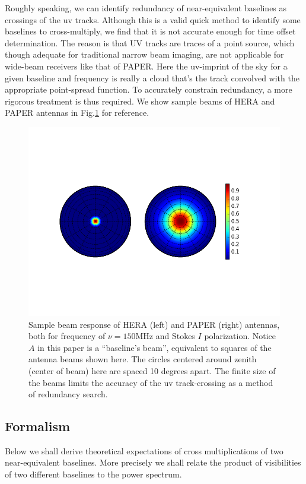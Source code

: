 \documentclass[preprint2,numberedappendix,tighten,twocolappendix]{aastex6}  %
\renewcommand\[{\begin{equation}}
\renewcommand\]{\end{equation}}
\begin{document}
Roughly speaking, we can identify
redundancy of near-equivalent baselines as crossings
of the uv tracks. Although this is a valid quick method to identify some baselines to cross-multiply, we find
that it is not accurate enough for time offset determination. The reason is that UV tracks are traces of a point source, which though adequate for traditional narrow beam imaging, are not applicable for wide-beam receivers like that of PAPER.
Here the uv-imprint of the sky for a given baseline and frequency is really a cloud that's the track convolved with the appropriate point-spread function. To accurately
constrain redundancy, a more rigorous treatment is thus required. 
We show sample beams of HERA and PAPER antennas in Fig.\ref{fig:Beam} for reference. 

\begin{figure}[H]
\includegraphics[width=1.2\linewidth]{Beams}

\caption{Sample beam response of HERA (left) and PAPER (right) antennas, both
for frequency of $\nu=150\text{MHz}$ and Stokes $I$ polarization. Notice $A$ in this paper is a ``baseline's beam'', equivalent to squares of the antenna beams shown here. The circles centered around zenith (center of beam) here are
spaced 10 degrees apart. The finite size of the beams limits the accuracy of the uv track-crossing as a method of redundancy search. \label{fig:Beam}}
\end{figure}



\subsection{Formalism}
Below we shall derive theoretical expectations of cross multiplications
of two near-equivalent baselines. More precisely we shall relate
the product of visibilities of two different baselines to the power spectrum. 
\end{document}
